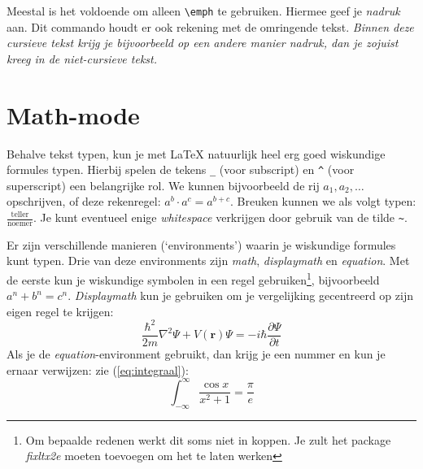 
Meestal is het voldoende om alleen \verb|\emph| te gebruiken. Hiermee geef je
\emph{nadruk} aan. Dit commando houdt er ook rekening met de omringende tekst.
\textit{Binnen deze cursieve tekst krijg je bijvoorbeeld op een \emph{andere
manier} nadruk, dan je zojuist kreeg in de niet-cursieve tekst.}


\section{Math-mode}


Behalve tekst typen, kun je met \LaTeX{} natuurlijk heel erg goed wiskundige
formules typen. Hierbij spelen de tekens \verb|_| (voor subscript) en \verb|^|
(voor superscript) een belangrijke rol. We kunnen bijvoorbeeld de rij
\(a_1,a_2,\ldots\) opschrijven, of deze rekenregel: \(a^b\cdot a^c = a^{b+c}\).
Breuken kunnen we als volgt typen: \(\frac{\text{teller}}{\text{noemer}}\). Je
kunt eventueel enige \emph{whitespace} verkrijgen door gebruik van de tilde
\verb|~|.


Er zijn verschillende manieren (`environments') waarin je wiskundige formules
kunt typen. Drie van deze environments zijn \emph{math}, \emph{displaymath} en
\emph{equation}. Met de eerste kun je wiskundige symbolen in een regel
gebruiken\footnote{Om bepaalde redenen werkt dit soms niet in koppen. Je zult
het package \textit{fixltx2e} moeten toevoegen om het te laten werken},
bijvoorbeeld \(a^n+b^n=c^n\). \emph{Displaymath} kun je gebruiken om je
vergelijking gecentreerd op zijn eigen regel te krijgen:
\[
	\frac{\hbar^2}{2m}\nabla^2\Psi + V(\mathbf{r})\Psi
		= -i\hbar \frac{\partial\Psi}{\partial t}
\]
Als je de \emph{equation}-environment gebruikt, dan krijg je een nummer en kun
je ernaar verwijzen: zie (\ref{eq:integraal}):
\begin{equation}
	\int_{-\infty}^{\infty} \frac{\cos x}{x^2 + 1} = \frac{\pi}{e}
	\label{eq:integraal}
\end{equation}

